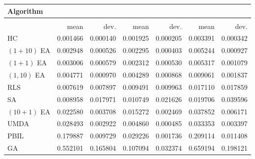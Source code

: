 \begin{tabular}{@{} l *{6}{>{{}}N{1}{2}} @{}}
\toprule
{Algorithm} &  \\
\midrule
&  &  &  \\
\midrule
& {mean} & {dev.} & {mean} & {dev.} & {mean} & {dev.} \\
\midrule
HC & 0.001466 & 0.000140 & 0.001925 & 0.000205 & 0.003391 & 0.000342 \\
$(1+10)$ EA & 0.002948 & 0.000526 & 0.002295 & 0.000403 & 0.005244 & 0.000927 \\
$(1+1)$ EA & 0.003006 & 0.000579 & 0.002312 & 0.000530 & 0.005317 & 0.001079 \\
$(1,10)$ EA & 0.004771 & 0.000970 & 0.004289 & 0.000868 & 0.009061 & 0.001837 \\
RLS & 0.007619 & 0.007897 & 0.009491 & 0.009963 & 0.017110 & 0.017859 \\
SA & 0.008958 & 0.017971 & 0.010749 & 0.021626 & 0.019706 & 0.039596 \\
$(10+1)$ EA & 0.022580 & 0.003708 & 0.015272 & 0.002469 & 0.037852 & 0.006171 \\
UMDA & 0.028493 & 0.002922 & 0.004860 & 0.000485 & 0.033353 & 0.003397 \\
PBIL & 0.179887 & 0.009729 & 0.029226 & 0.001736 & 0.209114 & 0.011408 \\
GA & 0.552101 & 0.165804 & 0.107094 & 0.032374 & 0.659194 & 0.198121 \\
\bottomrule
\end{tabular}
